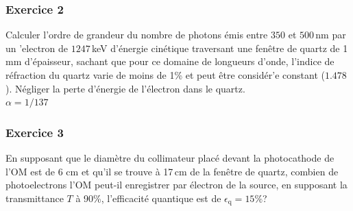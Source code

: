 
\subsubsection{Exercice 2}
Calculer l'ordre de grandeur du nombre de photons \'emis entre $350$ et $500$\,nm par un 'electron de $1247$\,keV d'\'energie cin\'etique traversant une fen\^etre de quartz de 1\,mm d'\'epaisseur, sachant que pour ce domaine de longueurs d’onde, l'indice de r\'efraction du quartz varie de moins de 1\% et peut \^etre consid\'er'e constant ($1.478$). N\'egliger la perte d'\'energie de l'\'electron dans le quartz.\\ $\alpha = 1/137$


\subsubsection{Exercice 3}
En supposant que le diam\`etre du collimateur plac\'e devant la photocathode de l'OM est de 6 cm et qu'il se trouve \`a 17\,cm de la fen\^etre de quartz, combien de photoelectrons l'OM peut-il enregistrer par \'electron de la source, en supposant la transmittance $T$ \`a 90\%, l'efficacit\'e quantique est de $\epsilon_\mathrm{q}=15\%$?

